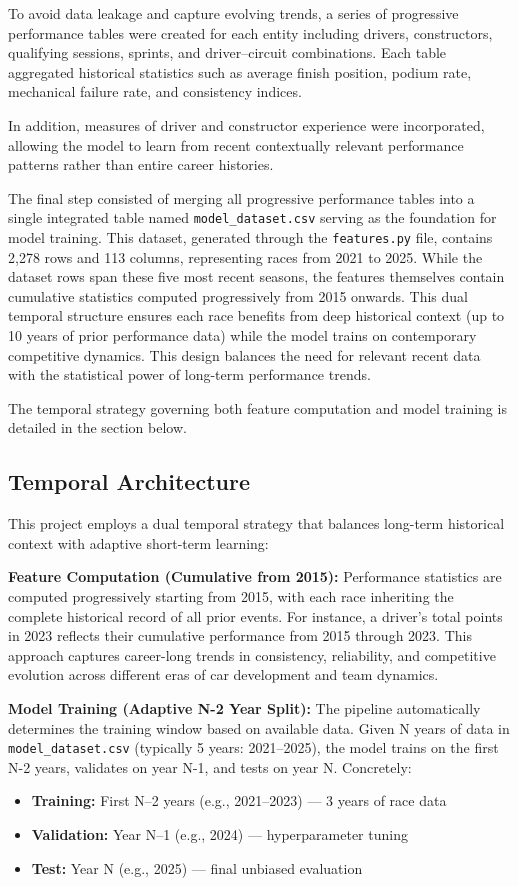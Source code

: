 \documentclass[11pt,a4paper]{article}
\begin{document}
To avoid data leakage and capture evolving trends, a series of progressive performance tables were created for each entity including drivers, constructors, qualifying sessions, sprints, and driver–circuit combinations. Each table aggregated historical statistics such as average finish position, podium rate, mechanical failure rate, and consistency indices.

In addition, measures of driver and constructor experience were incorporated, allowing the model to learn from recent contextually relevant performance patterns rather than entire career histories.

The final step consisted of merging all progressive performance tables into a single integrated table named \texttt{model\_dataset.csv} serving as the foundation for model training. This dataset, generated through the \texttt{features.py} file, contains 2,278 rows and 113 columns, representing races from 2021 to 2025. While the dataset rows span these five most recent seasons, the features themselves contain cumulative statistics computed progressively from 2015 onwards. This dual temporal structure ensures each race benefits from deep historical context (up to 10 years of prior performance data) while the model trains on contemporary competitive dynamics. This design balances the need for relevant recent data with the statistical power of long-term performance trends.

The temporal strategy governing both feature computation and model training is detailed in the section below.

\subsection{Temporal Architecture}
\label{subsec:temporal}

This project employs a dual temporal strategy that balances long-term historical context with adaptive short-term learning:

\textbf{Feature Computation (Cumulative from 2015):} Performance statistics are computed progressively starting from 2015, with each race inheriting the complete historical record of all prior events. For instance, a driver's total points in 2023 reflects their cumulative performance from 2015 through 2023. This approach captures career-long trends in consistency, reliability, and competitive evolution across different eras of car development and team dynamics.

\textbf{Model Training (Adaptive N-2 Year Split):} The pipeline automatically determines the training window based on available data. Given N years of data in \texttt{model\_dataset.csv} (typically 5 years: 2021–2025), the model trains on the first N-2 years, validates on year N-1, and tests on year N. Concretely: 
\begin{itemize}
    \item \textbf{Training:} First N–2 years (e.g., 2021–2023) — 3 years of race data
    \item \textbf{Validation:} Year N–1 (e.g., 2024) — hyperparameter tuning
    \item \textbf{Test:} Year N (e.g., 2025) — final unbiased evaluation
\end{itemize}
\end{document}
